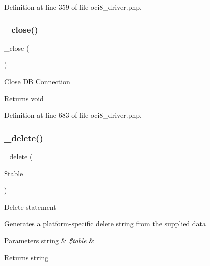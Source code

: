 Definition at line 359 of file oci8\+\_\+driver.\+php.

\mbox{\label{class_c_i___d_b__oci8__driver_a4d9082658000e5ede8312067c6dda9db}} 
\subsubsection{\texorpdfstring{\_close()}{\_close()}}
{\footnotesize\ttfamily \+\_\+close (\begin{DoxyParamCaption}{ }\end{DoxyParamCaption})\hspace{0.3cm}{\ttfamily [protected]}}

Close DB Connection

\begin{DoxyReturn}{Returns}
void 
\end{DoxyReturn}


Definition at line 683 of file oci8\+\_\+driver.\+php.

\mbox{\label{class_c_i___d_b__oci8__driver_a133ea8446ded52589bd22cc9163d0896}} 
\subsubsection{\texorpdfstring{\_delete()}{\_delete()}}
{\footnotesize\ttfamily \+\_\+delete (\begin{DoxyParamCaption}\item[{}]{\$table }\end{DoxyParamCaption})\hspace{0.3cm}{\ttfamily [protected]}}

Delete statement

Generates a platform-\/specific delete string from the supplied data


\begin{DoxyParams}[1]{Parameters}
string & {\em \$table} & \\
\hline
\end{DoxyParams}
\begin{DoxyReturn}{Returns}
string 
\end{DoxyReturn}


